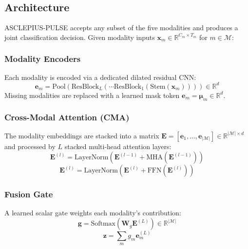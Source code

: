 \documentclass[journal]{IEEEtran}
\begin{document}
\subsection{Architecture}

ASCLEPIUS-PULSE accepts any subset of the five modalities and produces a
joint classification decision. Given modality inputs
$\mathbf{x}_m \in \mathbb{R}^{C_m \times T_m}$ for $m \in \mathcal{M}$:

\subsubsection{Modality Encoders}
Each modality is encoded via a dedicated dilated residual CNN:
\begin{equation}
  \mathbf{e}_m = \text{Pool}(\text{ResBlock}_L(\cdots\text{ResBlock}_1(\text{Stem}(\mathbf{x}_m))))
  \in \mathbb{R}^d
\end{equation}
Missing modalities are replaced with a learned mask token
$\mathbf{e}_m = \boldsymbol{\mu}_m \in \mathbb{R}^d$.

\subsubsection{Cross-Modal Attention (CMA)}
The modality embeddings are stacked into a matrix
$\mathbf{E} = [\mathbf{e}_1, \ldots, \mathbf{e}_{|\mathcal{M}|}] \in \mathbb{R}^{|\mathcal{M}| \times d}$
and processed by $L$ stacked multi-head attention layers:
\begin{equation}
  \mathbf{E}^{(l)} = \text{LayerNorm}\!\left(\mathbf{E}^{(l-1)} + \text{MHA}(\mathbf{E}^{(l-1)})\right)
\end{equation}
\begin{equation}
  \mathbf{E}^{(l)} = \text{LayerNorm}\!\left(\mathbf{E}^{(l)} + \text{FFN}(\mathbf{E}^{(l)})\right)
\end{equation}

\subsubsection{Fusion Gate}
A learned scalar gate weights each modality's contribution:
\begin{equation}
  \mathbf{g} = \text{Softmax}(\mathbf{W}_g \mathbf{E}^{(L)}) \in \mathbb{R}^{|\mathcal{M}|}
\end{equation}
\begin{equation}
  \mathbf{z} = \sum_{m} g_m \mathbf{e}_m^{(L)}
\end{equation}
\end{document}
